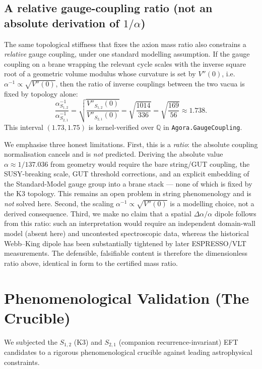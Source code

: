 \documentclass[11pt,a4paper]{article}
\begin{document}
\subsection{A relative gauge-coupling ratio (not an absolute derivation of $1/\alpha$)}\label{sec:gauge}
The same topological stiffness that fixes the axion mass ratio also constrains a \emph{relative} gauge coupling, under one standard modelling assumption. If the gauge coupling on a brane wrapping the relevant cycle scales with the inverse square root of a geometric volume modulus whose curvature is set by $V''(0)$, i.e.\ $\alpha^{-1}\propto\sqrt{V''(0)}$, then the ratio of inverse couplings between the two vacua is fixed by topology alone:
\begin{equation}
\frac{\alpha^{-1}_{S_{1,2}}}{\alpha^{-1}_{S_{2,1}}} = \sqrt{\frac{V''_{S_{1,2}}(0)}{V''_{S_{2,1}}(0)}} = \sqrt{\frac{1014}{336}} = \sqrt{\frac{169}{56}} \approx 1.738 .
\end{equation}
This interval $(1.73,1.75)$ is kernel-verified over $\mathbb{Q}$ in \texttt{Agora.GaugeCoupling}.

We emphasise three honest limitations. First, this is a \emph{ratio}: the absolute coupling normalisation cancels and is \emph{not} predicted. Deriving the absolute value $\alpha\approx1/137.036$ from geometry would require the bare string/GUT coupling, the SUSY-breaking scale, GUT threshold corrections, and an explicit embedding of the Standard-Model gauge group into a brane stack — none of which is fixed by the K3 topology. This remains an open problem in string phenomenology and is \emph{not} solved here. Second, the scaling $\alpha^{-1}\propto\sqrt{V''(0)}$ is a modelling choice, not a derived consequence. Third, we make no claim that a spatial $\Delta\alpha/\alpha$ dipole follows from this ratio: such an interpretation would require an independent domain-wall model (absent here) and uncontested spectroscopic data, whereas the historical Webb--King dipole has been substantially tightened by later ESPRESSO/VLT measurements. The defensible, falsifiable content is therefore the dimensionless ratio above, identical in form to the certified mass ratio.

\section{Phenomenological Validation (The Crucible)}
We subjected the $S_{1,2}$ (K3) and $S_{2,1}$ (companion recurrence-invariant) EFT candidates to a rigorous phenomenological crucible against leading astrophysical constraints.
\end{document}
